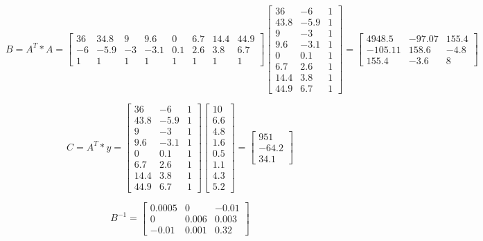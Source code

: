 \documentclass[a4paper,norsk]{article}
\begin{document}
\begin{equation*}
B = A^{T} * A = \begin{bmatrix}36 & 34.8 & 9 & 9.6 & 0 & 6.7&14.4&44.9\\ -6 & -5.9 &-3&-3.1&0.1&2.6&3.8&6.7\\1 & 1 & 1 & 1& 1 & 1 & 1 & 1\end{bmatrix}
\begin{bmatrix}36 & -6 & 1 \\ 43.8 & -5.9 & 1 \\9 & -3 & 1 \\ 9.6 & -3.1 & 1 \\0 & 0.1 & 1 \\6.7& 2.6 & 1 \\14.4 & 3.8 & 1 \\ 44.9 & 6.7 & 1\end{bmatrix}
=\begin{bmatrix}4948.5 & -97.07 & 155.4 \\ -105.11 & 158.6 & -4.8 \\ 155.4 & -3.6 & 8\end{bmatrix}
\end{equation*} 

\begin{equation*}
C = A^{T} * y = \begin{bmatrix}36 & -6 & 1 \\ 43.8 & -5.9 & 1 \\9 & -3 & 1 \\ 9.6 & -3.1 & 1 \\0 & 0.1 & 1 \\6.7& 2.6 & 1 \\14.4 & 3.8 & 1 \\ 44.9 & 6.7 & 1 \end{bmatrix}
\begin{bmatrix}10 \\ 6.6\\4.8\\1.6\\0.5\\1.1\\4.3\\5.2\end{bmatrix}
=\begin{bmatrix} 951 \\ -64.2 \\ 34.1 \end{bmatrix}
\end{equation*}

\begin{equation*}
B^{-1} = \begin{bmatrix} 0.0005  & 0 & -0.01\\ 0 & 0.006 & 0.003 \\ -0.01 & 0.001 & 0.32 \end{bmatrix}
\end{equation*}
\end{document}
